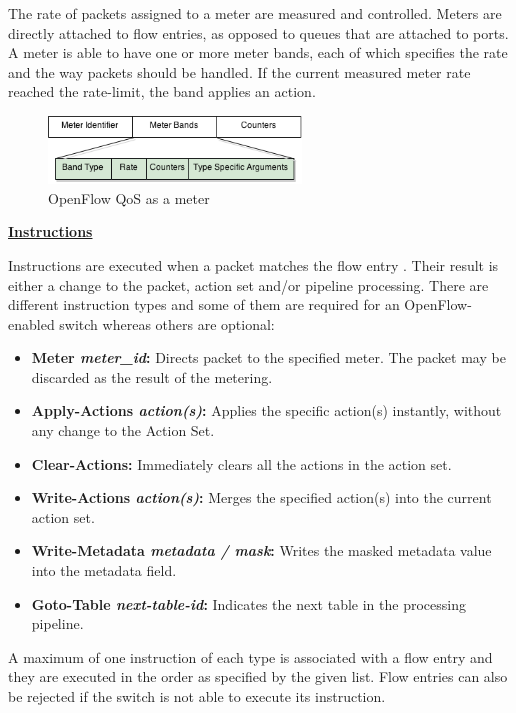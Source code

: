 The rate of packets assigned to a meter are measured and controlled. Meters are directly attached to flow entries, as opposed to queues that are attached to ports. A meter is able to have one or more meter bands, each of which specifies the rate and the way packets should be handled. If the current measured meter rate reached the rate-limit, the band applies an action. 

\begin{figure}[H]
\centering
\includegraphics[width=0.6\textwidth]{images/fundamentals/openflow_qos.png}
\caption{OpenFlow QoS as a meter}
\end{figure}


\underline{\textbf{Instructions}}

Instructions are executed when a packet matches the flow entry \cite{ofspecification}. Their result is either a change to the packet, action set and/or pipeline processing. There are different instruction types and some of them are required for an OpenFlow-enabled switch whereas others are optional:

\begin{itemize}
\item \textbf{Meter \textit{meter\_id}:} Directs packet to the specified meter. The packet may be discarded as the result of the metering.
\item \textbf{Apply-Actions \textit{action(s)}:} Applies the specific action(s) instantly, without any change to the Action Set.
\item \textbf{Clear-Actions:} Immediately clears all the actions in the action set.
\item \textbf{Write-Actions \textit{action(s)}:} Merges the specified action(s) into the current action set.
\item \textbf{Write-Metadata \textit{metadata / mask}:} Writes the masked metadata value into the metadata field.
\item \textbf{Goto-Table \textit{next-table-id}:} Indicates the next table in the processing pipeline.
\end{itemize}

A maximum of one instruction of each type is associated with a flow entry and they are executed in the order as specified by the given list. Flow entries can also be rejected if the switch is not able to execute its instruction.


